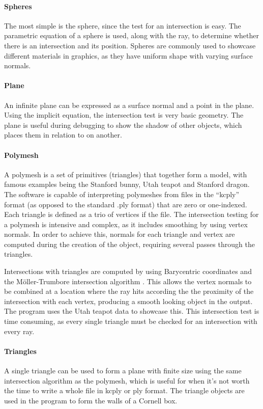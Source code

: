 \documentclass[a4paper]{article}
\begin{document}
\paragraph{Spheres} The most simple is the sphere, since the test for an intersection is easy. The parametric equation of a sphere is used, along with the ray, to determine whether there is an intersection and its position. Spheres are commonly used to showcase different materials in graphics, as they have uniform shape with varying surface normals.

\paragraph{Plane} An infinite plane can be expressed as a surface normal and a point in the plane. Using the implicit equation, the intersection test is very basic geometry. The plane is useful during debugging to show the shadow of other objects, which places them in relation to on another.

\paragraph{Polymesh} A polymesh is a set of primitives (triangles) that together form a model, with famous examples being the Stanford bunny, Utah teapot and Stanford dragon. The software is capable of interpreting polymeshes from files in the ``kcply'' format (as opposed to the standard .ply format) that are zero or one-indexed. Each triangle is defined as a trio of vertices if the file. The intersection testing for a polymesh is intensive and complex, as it includes smoothing by using vertex normals. In order to achieve this, normals for each triangle and vertex are computed during the creation of the object, requiring several passes through the triangles.

Intersections with triangles are computed by using Barycentric coordinates and the M{\"o}ller-Trumbore intersection algorithm \cite{}. This allows the vertex normals to be combined at a location where the ray hits according the the proximity of the intersection with each vertex, producing a smooth looking object in the output. The program uses the Utah teapot data to showcase this. This intersection test is time consuming, as every single triangle must be checked for an intersection with every ray.

\paragraph{Triangles} A single triangle can be used to form a plane with finite size using the same intersection algorithm as the polymesh, which is useful for when it's not worth the time to write a whole file in kcply or ply format. The triangle objects are used in the program to form the walls of a Cornell box.
\end{document}
